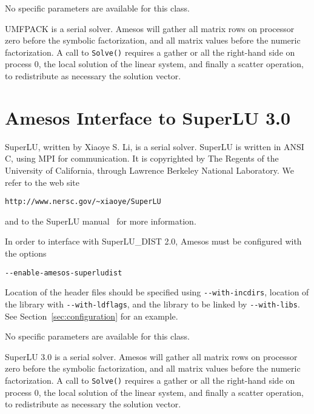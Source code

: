 \documentclass[11pt]{SANDreport}
\begin{document}
\smallskip

No specific parameters are available for this class.

\smallskip

UMFPACK is a serial solver. Amesos will gather all matrix rows on processor
zero before the symbolic factorization, and all matrix values before the
numeric factorization. A call to \verb!Solve()! requires a gather
or all the right-hand side on process 0, the local solution of the linear
system, and finally a scatter operation, to redistribute as necessary the
solution vector.

\section{Amesos Interface to SuperLU 3.0}
\label{sec:superlu}

SuperLU, written by Xiaoye S. Li, is a serial solver.
SuperLU is written in ANSI C, using MPI
for communication. It is copyrighted by The Regents of the University of
California, through Lawrence Berkeley National Laboratory.  We refer to
the web site
\begin{verbatim}
http://www.nersc.gov/~xiaoye/SuperLU
\end{verbatim}
and to the SuperLU manual~\cite{superlu-manual} for more
information.

\medskip

In order to interface with SuperLU\_DIST 2.0, Amesos must be configured with
the options
\begin{verbatim}
--enable-amesos-superludist 
\end{verbatim}
Location of the header files should be specified using \verb!--with-incdirs!,
location of the library with \verb!--with-ldflags!, and the library
to be linked by \verb!--with-libs!. See Section~\ref{sec:configuration} for an
example.

\smallskip

No specific parameters are available for this class.

\smallskip

SuperLU 3.0 is a serial solver. Amesos will gather all matrix rows on processor
zero before the symbolic factorization, and all matrix values before the
numeric factorization. A call to \verb!Solve()! requires a gather
or all the right-hand side on process 0, the local solution of the linear
system, and finally a scatter operation, to redistribute as necessary the
solution vector.
\end{document}
